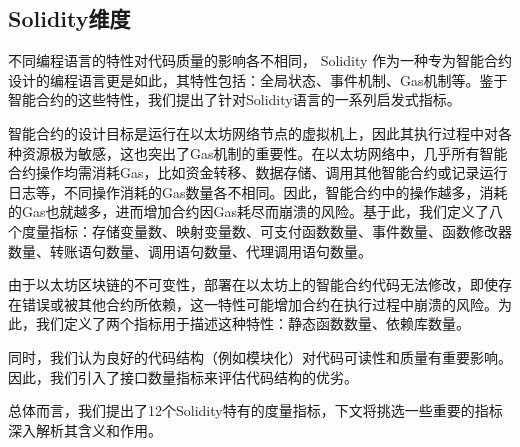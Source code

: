 \subsection{Solidity维度}
\label{sec:Solidity维度}
不同编程语言的特性对代码质量的影响各不相同， Solidity 作为一种专为智能合约设计的编程语言更是如此，其特性包括：全局状态、事件机制、Gas机制等。鉴于智能合约的这些特性，我们提出了针对Solidity语言的一系列启发式指标。

智能合约的设计目标是运行在以太坊网络节点的虚拟机上，因此其执行过程中对各种资源极为敏感，这也突出了Gas机制的重要性。在以太坊网络中，几乎所有智能合约操作均需消耗Gas，比如资金转移、数据存储、调用其他智能合约或记录运行日志等，不同操作消耗的Gas数量各不相同。因此，智能合约中的操作越多，消耗的Gas也就越多，进而增加合约因Gas耗尽而崩溃的风险\cite{qianpeng2022zh}。基于此，我们定义了八个度量指标：存储变量数、映射变量数、可支付函数数量、事件数量、函数修改器数量、转账语句数量、调用语句数量、代理调用语句数量。

由于以太坊区块链的不可变性，部署在以太坊上的智能合约代码无法修改，即使存在错误或被其他合约所依赖，这一特性可能增加合约在执行过程中崩溃的风险。为此，我们定义了两个指标用于描述这种特性：静态函数数量、依赖库数量。

同时，我们认为良好的代码结构（例如模块化）对代码可读性和质量有重要影响。因此，我们引入了接口数量指标来评估代码结构的优劣。

总体而言，我们提出了12个Solidity特有的度量指标，下文将挑选一些重要的指标深入解析其含义和作用。

